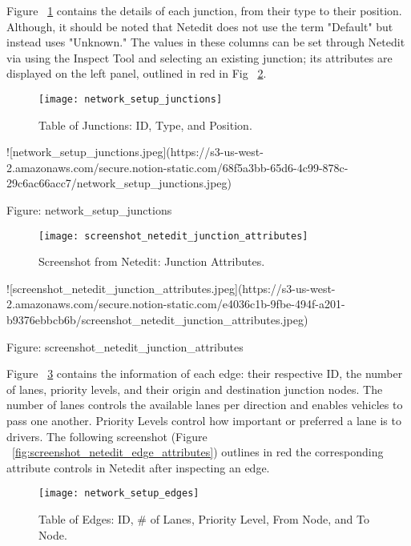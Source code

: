 Figure ~\ref{fig:network_setup_junctions} contains the details of each junction, from their type to their position. Although, it should be noted that Netedit does not use the term "Default" but instead uses "Unknown." The values in these columns can be set through Netedit via using the Inspect Tool and selecting an existing junction; \acrshort{its} attributes are displayed on the left panel, outlined in red in Fig ~\ref{fig:screenshot_netedit_junction_attributes}.

\begin{figure}
\texttt{[image: network\_setup\_junctions]}
\caption{Table of Junctions: ID, Type, and Position.}
\label{fig:network_setup_junctions}
\end{figure}

![network_setup_junctions.jpeg](https://s3-us-west-2.amazonaws.com/secure.notion-static.com/68f5a3bb-65d6-4c99-878c-29c6ac66acc7/network_setup_junctions.jpeg)

Figure: network_setup_junctions

\begin{figure}
\texttt{[image: screenshot\_netedit\_junction\_attributes]}
\caption{Screenshot from Netedit: Junction Attributes.}
\label{fig:screenshot_netedit_junction_attributes}
\end{figure}

![screenshot_netedit_junction_attributes.jpeg](https://s3-us-west-2.amazonaws.com/secure.notion-static.com/e4036c1b-9fbe-494f-a201-b9376ebbcb6b/screenshot_netedit_junction_attributes.jpeg)

Figure: screenshot_netedit_junction_attributes

Figure ~\ref{fig:network_setup_edges} contains the information of each edge: their respective ID, the number of lanes, priority levels, and their origin and destination junction nodes. The number of lanes controls the available lanes per direction and enables vehicles to pass one another. Priority Levels control how important or preferred a lane is to drivers. The following screenshot (Figure ~\ref{fig:screenshot_netedit_edge_attributes}) outlines in red the corresponding attribute controls in Netedit after inspecting an edge.

\begin{figure}
\texttt{[image: network\_setup\_edges]}
\caption{Table of Edges: ID, # of Lanes, Priority Level, From Node, and To Node.}
\label{fig:network_setup_edges}
\end{figure}

